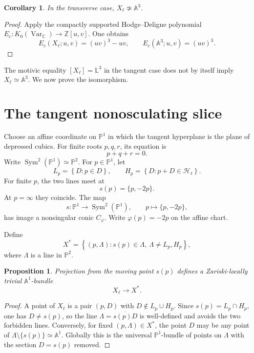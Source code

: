 \documentclass[11pt,reqno]{amsart}
\newtheorem{proposition}[proposition]{Proposition}
\newtheorem{corollary}[corollary]{Corollary}
\theoremstyle{definition}
\theoremstyle{remark}
\newcommand{\A}{\mathbb A}
\newcommand{\Pj}{\mathbb P}
\newcommand{\C}{\mathbb C}
\newcommand{\Z}{\mathbb Z}
\newcommand{\cH}{\mathscr H}
\newcommand{\Sym}{\operatorname{Sym}}
\newcommand{\LL}{\mathbb L}
\newcommand{\KVar}{K_0(\operatorname{Var}_{\C})}
\newcommand{\set}[1]{\left\{#1\right\}}
\begin{document}
\begin{corollary}\label{cor:transverse-not-affine}
In the transverse case, $X_\ell\not\simeq\A^3$.
\end{corollary}

\begin{proof}
Apply the compactly supported Hodge--Deligne polynomial
$E_c:\KVar\to\Z[u,v]$.  One obtains
\[
 E_c(X_\ell;u,v)=(uv)^3-uv,
 \qquad
 E_c(\A^3;u,v)=(uv)^3.
\]
\end{proof}

The motivic equality $[X_\ell]=\LL^3$ in the tangent case does not by
itself imply $X_\ell\simeq\A^3$.  We now prove the isomorphism.

\section{The tangent nonosculating slice}\label{sec:tangent}

Choose an affine coordinate on $\Pj^1$ in which the tangent hyperplane is
the plane of depressed cubics.  For finite roots $p,q,r$, its equation is
\[
 p+q+r=0.
\]
Write $\Sym^2(\Pj^1)\simeq\Pj^2$.  For $p\in\Pj^1$, let
\[
 L_p=\set{D:p\in D},
 \qquad
 H_p=\set{D:p+D\in\cH_\ell}.
\]
For finite $p$, the two lines meet at
\[
 s(p)=\{p,-2p\}.
\]
At $p=\infty$ they coincide.  The map
\[
 s:\Pj^1\longrightarrow\Sym^2(\Pj^1),
 \qquad p\longmapsto\{p,-2p\},
\]
has image a nonsingular conic $C_\varphi$.  Write
$\varphi(p)=-2p$ on the affine chart.

Define
\[
 X^*=\set{(p,\Lambda):s(p)\in\Lambda,
 \ \Lambda\ne L_p,H_p},
\]
where $\Lambda$ is a line in $\Pj^2$.

\begin{proposition}\label{prop:first-A1-bundle}
Projection from the moving point $s(p)$ defines a Zariski-locally trivial
$\A^1$-bundle
\[
 X_\ell\longrightarrow X^*.
\]
\end{proposition}

\begin{proof}
A point of $X_\ell$ is a pair $(p,D)$ with
$D\notin L_p\cup H_p$.  Since $s(p)=L_p\cap H_p$, one has $D\ne s(p)$,
so the line $\Lambda=\overline{s(p)D}$ is well-defined and avoids the two
forbidden lines.  Conversely, for fixed $(p,\Lambda)\in X^*$, the point
$D$ may be any point of $\Lambda\setminus\{s(p)\}\simeq\A^1$.
Globally this is the universal $\Pj^1$-bundle of points on $\Lambda$ with
the section $D=s(p)$ removed.
\end{proof}
\end{document}
